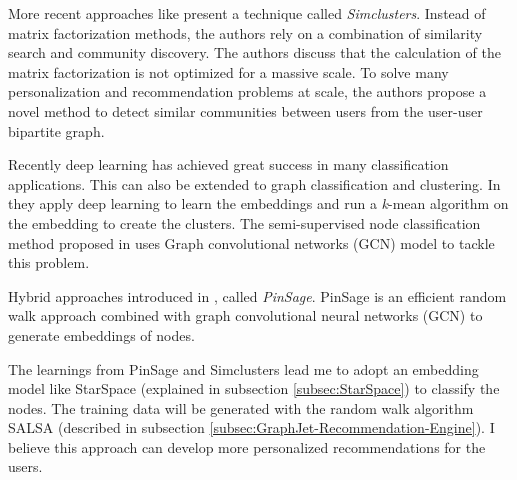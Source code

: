 More recent approaches like \cite{satuluri2020simclusters} present a technique called \emph{Simclusters}. Instead of matrix factorization methods, the authors rely on a combination of similarity search
and community discovery. The authors discuss that the calculation of the matrix factorization is not optimized for a massive scale. To solve many personalization and recommendation problems at scale, the authors propose a novel method to detect similar communities between users from the user-user bipartite graph.


Recently deep learning has achieved great success in many classification applications. This can also be extended to graph classification and clustering. In \cite{tian2014learning} they apply deep learning to learn the embeddings and run a \emph{k}-mean algorithm on the embedding to create the clusters. The semi-supervised node classification method proposed in \cite{kipf2016semi} uses Graph convolutional networks (GCN) model to tackle this problem. 

Hybrid approaches introduced in \cite{ying2018graph}, called \emph{PinSage}. PinSage is an efficient random walk approach combined with graph convolutional neural networks (GCN) to generate embeddings of nodes.


The learnings from PinSage and Simclusters lead me to adopt an embedding model like StarSpace (explained in subsection \ref{subsec:StarSpace}) to classify the nodes. The training data will be generated with the random walk algorithm SALSA (described in subsection \ref{subsec:GraphJet-Recommendation-Engine}). I believe this approach can develop more personalized recommendations for the users.
